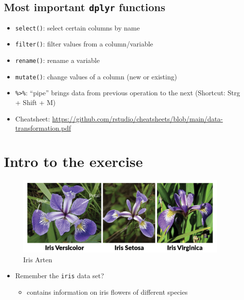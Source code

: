 \documentclass[
]{book}
\providecommand{\tightlist}{%
  \setlength{\itemsep}{0pt}\setlength{\parskip}{0pt}}
\begin{document}
\subsection{\texorpdfstring{Most important \texttt{dplyr} functions}{Most important dplyr functions}}\label{most-important-dplyr-functions}

\begin{itemize}
\item
  \texttt{select()}: select certain columns by name
\item
  \texttt{filter()}: filter values from a column/variable
\item
  \texttt{rename()}: rename a variable
\item
  \texttt{mutate()}: change values of a column (new or existing)
\item
  \texttt{\%\textgreater{}\%}: ``pipe'' brings data from previous operation to the next (Shortcut: Strg + Shift + M)
\item
  Cheatsheet: \url{https://github.com/rstudio/cheatsheets/blob/main/data-transformation.pdf}
\end{itemize}

\section{Intro to the exercise}\label{intro-to-the-exercise}

\begin{figure}
\centering
\includegraphics[width=\textwidth,height=1.5625in]{./img/iris-setosa.png}
\caption{Iris Arten}
\end{figure}

\begin{itemize}
\tightlist
\item
  Remember the \texttt{iris} data set?

  \begin{itemize}
  \tightlist
  \item
    contains information on iris flowers of different species
  \end{itemize}
\end{itemize}
\end{document}
